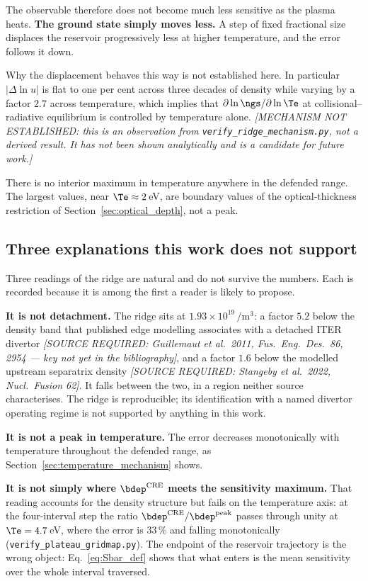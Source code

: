 The observable therefore does not become much less sensitive as the plasma
heats. \textbf{The ground state simply moves less.} A step of fixed fractional
size displaces the reservoir progressively less at higher temperature, and the
error follows it down.

Why the displacement behaves this way is not established here. In particular
$|\Delta\ln u|$ is flat to one per cent across three decades of density while
varying by a factor $2.7$ across temperature, which implies that
$\partial\ln\ngs/\partial\ln\Te$ at collisional--radiative equilibrium is
controlled by temperature alone. \emph{[MECHANISM NOT ESTABLISHED: this is an
observation from \texttt{verify\_ridge\_mechanism.py}, not a derived result. It
has not been shown analytically and is a candidate for future work.]}

There is no interior maximum in temperature anywhere in the defended range. The
largest values, near $\Te\approx2\,$eV, are boundary values of the
optical-thickness restriction of Section~\ref{sec:optical_depth}, not a peak.

\subsection{Three explanations this work does not support}
\label{sec:withdrawn}

Three readings of the ridge are natural and do not survive the numbers. Each is
recorded because it is among the first a reader is likely to propose.

\textbf{It is not detachment.} The ridge sits at
$1.93\times10^{19}\,\si{\per\cubic\metre}$: a factor $5.2$ below the density
band that published edge modelling associates with a detached ITER divertor
\emph{[SOURCE REQUIRED: Guillemaut et al.\ 2011, Fus.\ Eng.\ Des.\ 86, 2954 ---
key not yet in the bibliography]}, and a factor $1.6$ below the modelled
upstream separatrix density \emph{[SOURCE REQUIRED: Stangeby et al.\ 2022,
Nucl.\ Fusion 62]}. It falls between the two, in a region neither source
characterises. The ridge is reproducible; its identification with a named
divertor operating regime is not supported by anything in this work.

\textbf{It is not a peak in temperature.} The error decreases monotonically with
temperature throughout the defended range, as
Section~\ref{sec:temperature_mechanism} shows.

\textbf{It is not simply where $\bdep^{\rm CRE}$ meets the sensitivity
maximum.} That reading accounts for the density structure but fails on the
temperature axis: at the four-interval step the ratio
$\bdep^{\rm CRE}/\bdep^{\rm peak}$ passes through unity at $\Te = 4.7\,$eV,
where the error is $33\,\%$ and falling monotonically
(\texttt{verify\_plateau\_gridmap.py}). The endpoint of the reservoir
trajectory is the wrong object: Eq.~\eqref{eq:Sbar_def} shows that what enters
is the mean sensitivity over the whole interval traversed.

